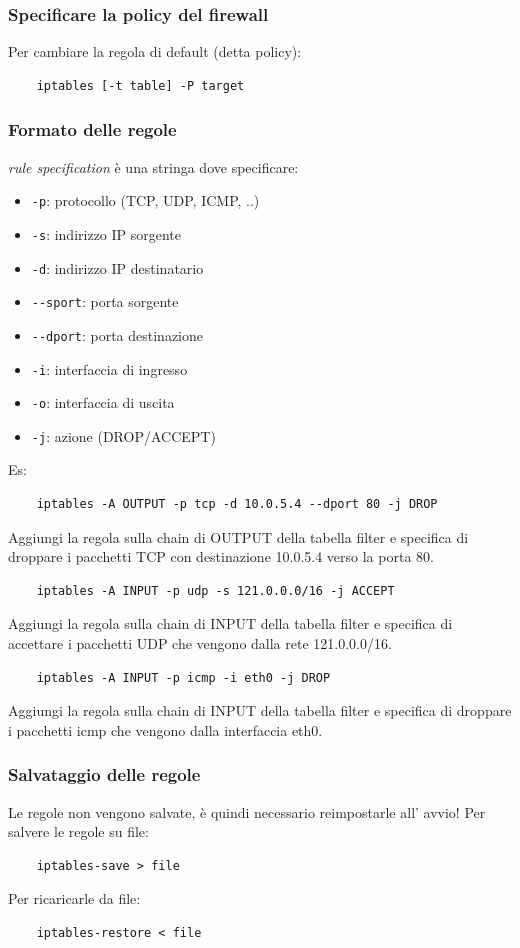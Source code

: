 {{{{\subsubsection{Specificare la policy del firewall}
Per cambiare la regola di default (detta policy):
\begin{verbatim}
    iptables [-t table] -P target
\end{verbatim}

\subsubsection{Formato delle regole}
\emph{rule specification} è una stringa dove specificare:
\begin{itemize}
    \item \verb{-p{: protocollo (TCP, UDP, ICMP, ..)
    \item \verb{-s{: indirizzo IP sorgente
    \item \verb{-d{: indirizzo IP destinatario
    \item \verb{--sport{: porta sorgente
    \item \verb{--dport{: porta destinazione
    \item \verb{-i{: interfaccia di ingresso
    \item \verb{-o{: interfaccia di uscita
    \item \verb{-j{: azione (DROP/ACCEPT)
\end{itemize}


Es:
\begin{verbatim}
    iptables -A OUTPUT -p tcp -d 10.0.5.4 --dport 80 -j DROP
\end{verbatim}
Aggiungi la regola sulla chain di OUTPUT della tabella filter e specifica di droppare i pacchetti TCP con destinazione 10.0.5.4 verso la porta 80.


\begin{verbatim}
    iptables -A INPUT -p udp -s 121.0.0.0/16 -j ACCEPT
\end{verbatim}
Aggiungi la regola sulla chain di INPUT della tabella filter e specifica di accettare i pacchetti UDP che vengono dalla rete 121.0.0.0/16.


\begin{verbatim}
    iptables -A INPUT -p icmp -i eth0 -j DROP
\end{verbatim}
Aggiungi la regola sulla chain di INPUT della tabella filter e specifica di droppare i pacchetti icmp che vengono dalla interfaccia eth0.


\subsubsection{Salvataggio delle regole}
Le regole non vengono salvate, è quindi necessario reimpostarle all' avvio!
Per salvere le regole su file:
\begin{verbatim}
    iptables-save > file
\end{verbatim}
Per ricaricarle da file:
\begin{verbatim}
    iptables-restore < file
\end{verbatim}


}}}}

